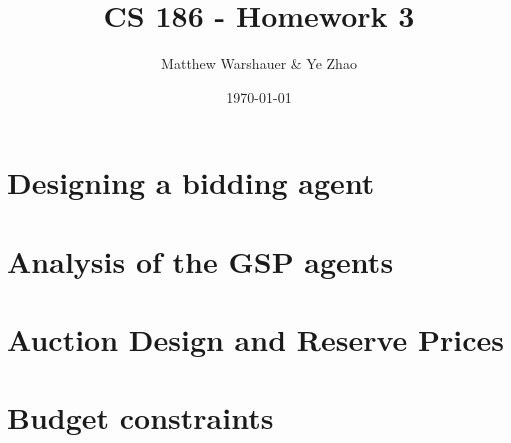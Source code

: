 \documentclass[11pt]{article}
\title{\bf CS 186 - Homework 3}
\date{\today}
\author{Matthew Warshauer \& Ye Zhao}
\begin{document}
\maketitle
\section{Designing a bidding agent}
\section{Analysis of the GSP agents}
\section{Auction Design and Reserve Prices}
\section{Budget constraints}
\end{document}
